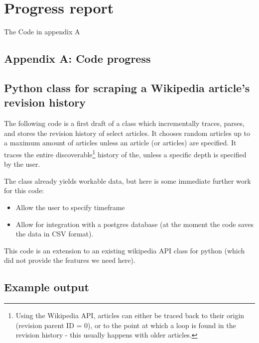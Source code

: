 \documentclass[a4paper,11pt,twoside,notitlepage]{article}
\begin{document}
        \section{Progress report}
        
        The Code in appendix A


\clearpage
\printbibheading[heading=bibintoc,title={References}]
\printbibliography[keyword=wiki,heading=subbibliography,title={Wikipedia}]
\printbibliography[keyword=edit,heading=subbibliography,title={Edit
distance}]

        
\clearpage
\begin{appendices}
\section{Appendix A: Code progress}
\subsection{Python class for scraping a Wikipedia article's revision history}
The following code is a first draft of a class which incrementally
traces, parses, and stores the revision history of select articles. It
chooses random articles up to a maximum amount of articles unless an
article (or articles) are specified. It traces the entire
discoverable\footnote{Using the Wikipedia API, articles can either be
  traced back to their origin (revision parent ID = 0), or to the
  point at which a loop is found in the revision history - this
  usually happens with older articles.} history of the, unless a
specific depth is specified by the user.

The class already yields workable data, but here is some immediate
further work for this code:
\begin{itemize}
  \item Allow the user to specify timeframe
  \item Allow for integration with a postgres database (at the moment
    the code saves the data in CSV format).
\end{itemize}

This code is an extension to an existing wikipedia API class for
python (which did not provide the features we need
here).\cite{python-wikipedia}


\subsection{Example output}


\end{appendices}
\end{document}
